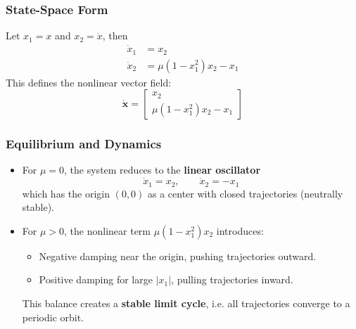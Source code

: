 \subsubsection{State-Space Form}
Let $x_1 = x$ and $x_2 = \dot{x}$, then
\begin{align}
    \dot{x}_1 &= x_2 \\
    \dot{x}_2 &= \mu(1 - x_1^2)x_2 - x_1
\end{align}
This defines the nonlinear vector field:
\begin{equation}
\boxed{
\dot{\mathbf{x}} =
\begin{bmatrix}
x_2 \\
\mu(1-x_1^2)x_2 - x_1
\end{bmatrix}}
\end{equation}

\subsubsection{Equilibrium and Dynamics}
\begin{itemize}
    \item For $\mu = 0$, the system reduces to the \textbf{linear oscillator}
    \begin{equation}
        \boxed{\dot{x}_1 = x_2, \qquad \dot{x}_2 = -x_1}
    \end{equation}
    which has the origin $(0,0)$ as a center with closed trajectories (neutrally stable).



    \item For $\mu > 0$, the nonlinear term $\mu(1-x_1^2)x_2$ introduces:
    \begin{itemize}
        \item Negative damping near the origin, pushing trajectories outward.
        \item Positive damping for large $|x_1|$, pulling trajectories inward.
    \end{itemize}
    This balance creates a \textbf{stable limit cycle}, i.e. all trajectories converge to a periodic orbit.
\end{itemize}

